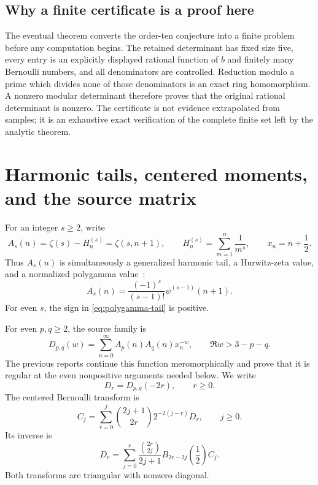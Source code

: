 \documentclass[11pt]{article}
\theoremstyle{definition}
\begin{document}
\subsection{Why a finite certificate is a proof here}

The eventual theorem converts the order-ten conjecture into a finite
problem before any computation begins.  The retained determinant has
fixed size five, every entry is an explicitly displayed rational
function of $b$ and finitely many Bernoulli numbers, and all denominators
are controlled.  Reduction modulo a prime which divides none of those
denominators is an exact ring homomorphism.  A nonzero modular
determinant therefore proves that the original rational determinant is
nonzero.  The certificate is not evidence extrapolated from samples;
it is an exhaustive exact verification of the complete finite set left
by the analytic theorem.
 \section{Harmonic tails, centered moments, and the source matrix}
\label{sec:framework}

For an integer $s\ge2$, write
\begin{equation}
 A_s(n)=\zeta(s)-H_n^{(s)}=\zeta(s,n+1),
 \qquad
 H_n^{(s)}=\sum_{m=1}^n\frac1{m^s},
 \qquad x_n=n+\frac12.
 \label{eq:tail}
\end{equation}
Thus $A_s(n)$ is simultaneously a generalized harmonic tail, a
Hurwitz-zeta value, and a normalized polygamma value~\cite{DLMF}:
\begin{equation}
 A_s(n)=\frac{(-1)^s}{(s-1)!}\psi^{(s-1)}(n+1).
 \label{eq:polygamma-tail}
\end{equation}
For even $s$, the sign in \eqref{eq:polygamma-tail} is positive.

For even $p,q\ge2$, the source family is
\begin{equation}
 D_{p,q}(w)=\sum_{n=0}^{\infty}A_p(n)A_q(n)x_n^{-w},
 \qquad \Re w>3-p-q.
 \label{eq:dirichlet-family}
\end{equation}
The previous reports continue this function meromorphically and prove
that it is regular at the even nonpositive arguments needed below.  We
write
\[
 D_r=D_{p,q}(-2r),\qquad r\ge0.
\]
The centered Bernoulli transform is
\begin{equation}
 C_j=\sum_{r=0}^j
       \binom{2j+1}{2r}2^{-2(j-r)}D_r,
 \qquad j\ge0.
 \label{eq:C-transform}
\end{equation}
Its inverse is
\begin{equation}
 D_r=\sum_{j=0}^r\frac{\binom{2r}{2j}}{2j+1}
 B_{2r-2j}\!\left(\frac12\right)C_j.
 \label{eq:C-inverse}
\end{equation}
Both transforms are triangular with nonzero diagonal.
\end{document}
